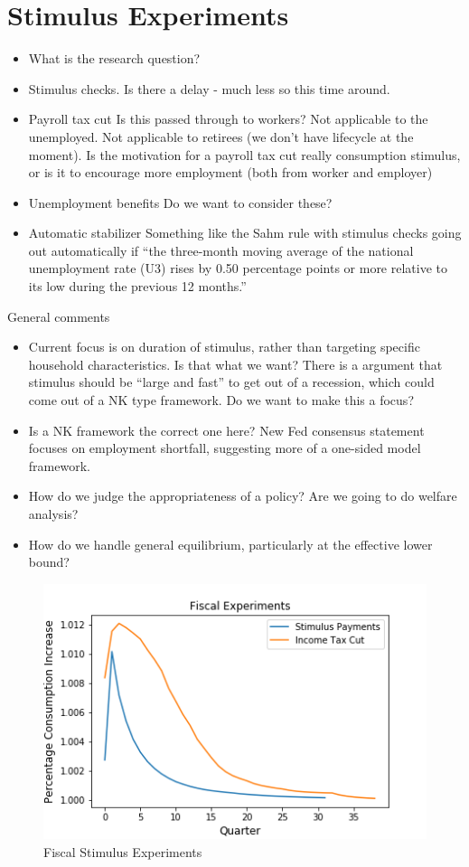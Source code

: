 \documentclass[]{article}
\begin{document}
\section{Stimulus Experiments}


\begin{itemize}
	\item What is the research question?
	\item Stimulus checks. Is there a delay - much less so this time around.
	\item Payroll tax cut
	\subitem Is this passed through to workers? 
	\subitem Not applicable to the unemployed. 
	\subitem Not applicable to retirees (we don't have lifecycle at the moment).
	\subitem Is the motivation for a payroll tax cut really consumption stimulus, or is it to encourage more employment (both from worker and employer)
	\item Unemployment benefits
	\subitem Do we want to consider these?
	\item Automatic stabilizer
	\subitem Something like the Sahm rule with stimulus checks going out automatically if ``the three-month moving average of the national unemployment rate (U3) rises by 0.50 percentage points or more relative to its low during the previous 12 months.''
\end{itemize}

General comments
\begin{itemize}
	\item Current focus is on duration of stimulus, rather than targeting specific household characteristics. Is that what we want? There is a argument that stimulus should be ``large and fast'' to get out of a recession, which could come out of a NK type framework. Do we want to make this a focus?
	\item Is a NK framework the correct one here? New Fed consensus statement focuses on employment shortfall, suggesting more of a one-sided model framework.
	\item How do we judge the appropriateness of a policy? Are we going to do welfare analysis?
	\item How do we handle general equilibrium, particularly at the effective lower bound?
\end{itemize}

	\begin{figure} 
	\begin{centering}
		\includegraphics[scale=0.85]{./Figures/FiscalExperiments.png}
		\caption{Fiscal Stimulus Experiments}
		\label{fig:Fiscal_experiments}
	\end{centering}
	\end{figure}
\end{document}
